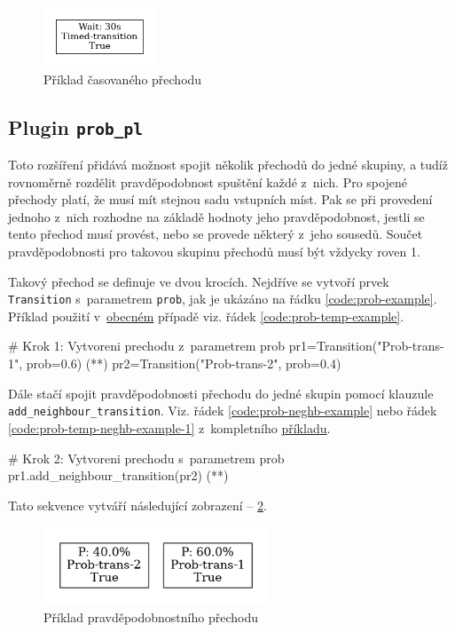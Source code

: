 \begin{figure}[hbt]
  \centering
  \includegraphics[width=0.3\textwidth]{obrazky-figures/timed-transition.png}
  \caption{Příklad časovaného přechodu}
  \label{timed-transition}
\end{figure}

\subsection{Plugin \texttt{prob\_pl}}
\label{subsec:prob_pl}
Toto rozšíření přidává možnost spojit několik přechodů do jedné skupiny, a tudíž rovnoměrně rozdělit pravděpodobnost spuštění každé z~nich. Pro spojené přechody platí, že musí mít stejnou sadu vstupních míst. Pak se při provedení jednoho z~nich rozhodne na základě hodnoty jeho pravděpodobnost, jestli se tento přechod musí provést, nebo se provede některý z~jeho sousedů. Součet pravděpodobnosti pro takovou skupinu přechodů musí být vždycky roven 1.

Takový přechod se definuje ve dvou krocích. Nejdříve se vytvoří prvek \texttt{Transition} s~parametrem \texttt{prob}, jak je ukázáno na řádku \ref{code:prob-example}. Příklad použití v~\hyperref[code:prob-ev-draw]{obecném} případě viz. řádek \ref{code:prob-temp-example}.
\begin{python}
  # Krok 1: Vytvoreni prechodu z~parametrem prob
  pr1=Transition("Prob-trans-1", prob=0.6) (*\label{code:prob-example}*)
  pr2=Transition("Prob-trans-2", prob=0.4)
\end{python}

Dále stačí spojit pravděpodobnosti přechodu do jedné skupin pomocí klauzule \\ \texttt{add\_neighbour\_transition}. Viz. řádek \ref{code:prob-neghb-example} nebo řádek \ref{code:prob-temp-neghb-example-1} z~kompletního \hyperref[code:prob-ev-draw]{příkladu}.
\begin{python}
  # Krok 2: Vytvoreni prechodu s~parametrem prob
  pr1.add_neighbour_transition(pr2) (*\label{code:prob-neghb-example}*)
\end{python}

Tato sekvence vytváří následující zobrazení -- \ref{prob-transition}.

\begin{figure}[hbt]
  \centering
  \includegraphics[width=0.6\textwidth]{obrazky-figures/prob-transition.png}
  \caption{Příklad pravděpodobnostního přechodu}
  \label{prob-transition}
\end{figure}


